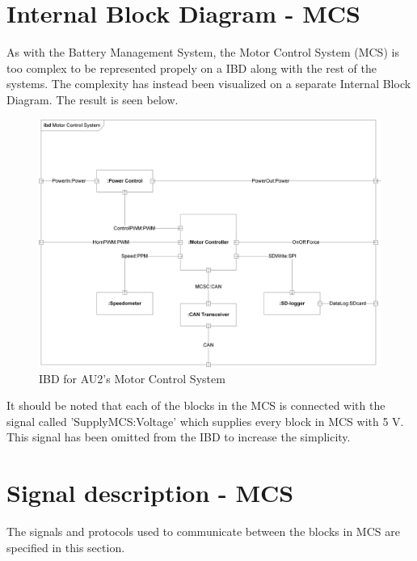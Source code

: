 \section{Internal Block Diagram - MCS}
As with the Battery Management System, the Motor Control System (MCS) is too complex to be represented propely on a IBD along with the rest of the systems. The complexity has instead been visualized on a separate Internal Block Diagram. The result is seen below.

\begin{figure}[H]
	\centering
	\includegraphics[width=1\linewidth]{Architecture/Diagrams/IBD_MCS}
	\caption{IBD for AU2's Motor Control System}
	\label{fig:IBD_MCS}
\end{figure}

It should be noted that each of the blocks in the MCS is connected with the signal called 'SupplyMCS:Voltage' which supplies every block in MCS with 5 V. This signal has been omitted from the IBD to increase the simplicity.

\section{Signal description - MCS}
The signals and protocols used to communicate between the blocks in MCS are specified in this section.

